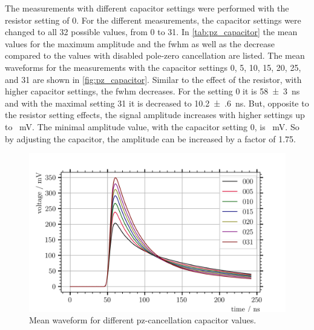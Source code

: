 The measurements with different capacitor settings were performed with the resistor setting of 0.
For the different measurements, the capacitor settings were changed to all 32 possible values, from 0 to 31.
In \autoref{tab:pz_capacitor} the mean values for the maximum amplitude and the \ac{fwhm} as well as the decrease compared to the values with disabled pole-zero cancellation are listed.
The mean waveforms for the measurements with the capacitor settings 0, 5, 10, 15, 20, 25, and 31 are shown in \autoref{fig:pz_capacitor}.
Similar to the effect of the resistor, with higher capacitor settings, the \ac{fwhm} decreases.
For the setting 0 it is \SI{58(3)}{\nano\second} and with the maximal setting 31 it is decreased to \SI{10.2(6)}{\nano\second}.
But, opposite to the resistor setting effects, the signal amplitude increases with higher settings up to \SI{}{\milli\volt}.
The minimal amplitude value, with the capacitor setting 0, is \SI{}{\milli\volt}.
So by adjusting the capacitor, the amplitude can be increased by a factor of \num{1.75}.
\begin{figure}
	\centering
	\includegraphics[width=1.\textwidth]{pictures/pz_capacitor}
	\caption[Mean waveform for different pz-cancellation capacitor values.]{Mean waveform for different pz-cancellation capacitor values.}
	\label{fig:pz_capacitor}
\end{figure}

